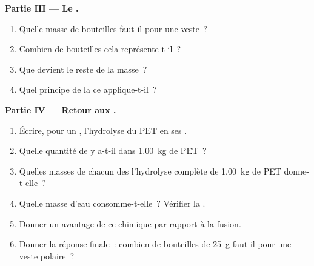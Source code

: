 \begin{problem}
\medskip
\noindent\textbf{Partie III --- Le .}
\begin{enumerate}[resume]
  \item Quelle masse de bouteilles faut-il pour une veste~?
  \item Combien de bouteilles cela représente-t-il~?
  \item Que devient le reste de la masse~?
  \item Quel principe de la  ce  applique-t-il~?
\end{enumerate}

\medskip
\noindent\textbf{Partie IV --- Retour aux .}
\begin{enumerate}[resume]
  \item Écrire, pour un , l'hydrolyse du PET en ses .
  \item Quelle quantité de  y a-t-il dans \qty{1.00}{kg} de PET~?
  \item Quelles masses de chacun des  l'hydrolyse complète de
        \qty{1.00}{kg} de PET donne-t-elle~?
  \item Quelle masse d'eau consomme-t-elle~? Vérifier la .
  \item Donner un avantage de ce  chimique par rapport à la
        fusion.
  \item Donner la réponse finale~: combien de bouteilles de \qty{25}{g}
        faut-il pour une veste polaire~?
\end{enumerate}
\end{problem}

